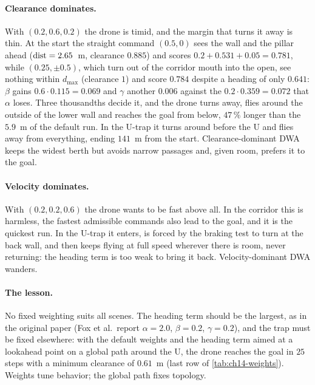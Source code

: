 \paragraph{Clearance dominates.}
With $(0.2, 0.6, 0.2)$ the drone is timid, and the margin that turns it away
is thin. At the start the straight command $(0.5, 0)$ sees the wall and the
pillar ahead ($\operatorname{dist} = 2.65$~m, clearance $0.885$) and scores
$0.2 + 0.531 + 0.05 = 0.781$, while $(0.25, \pm 0.5)$, which turn out of the
corridor mouth into the open, see nothing within $d_{\max}$ (clearance $1$)
and score $0.784$ despite a heading of only $0.641$: $\beta$ gains
$0.6 \cdot 0.115 = 0.069$ and $\gamma$ another $0.006$ against the
$0.2 \cdot 0.359 = 0.072$ that $\alpha$ loses. Three thousandths decide it, and
the drone turns away, flies around the outside of the lower wall and reaches
the goal from below, $47\,\%$ longer than the $5.9$~m of the default run. In the
U-trap it turns around before the U and flies away from everything, ending
$141$~m from the start. Clearance-dominant DWA keeps the widest berth but
avoids narrow passages and, given room, prefers it to the goal.

\paragraph{Velocity dominates.}
With $(0.2, 0.2, 0.6)$ the drone wants to be fast above all. In the corridor
this is harmless, the fastest admissible commands also lead to the goal, and
it is the quickest run. In the U-trap it enters, is forced by the braking test
to turn at the back wall, and then keeps flying at full speed wherever there
is room, never returning: the heading term is too weak to bring it back.
Velocity-dominant DWA wanders.

\paragraph{The lesson.}
No fixed weighting suits all scenes. The heading term should be the largest,
as in the original paper (Fox et al.\ report $\alpha = 2.0$, $\beta = 0.2$,
$\gamma = 0.2$), and the trap must be fixed elsewhere: with the default
weights and the heading term aimed at a lookahead point on a global path
around the U, the drone reaches the goal in $25$ steps with a minimum
clearance of $0.61$~m (last row of \cref{tab:ch14-weights}). Weights tune
behavior; the global path fixes topology.

